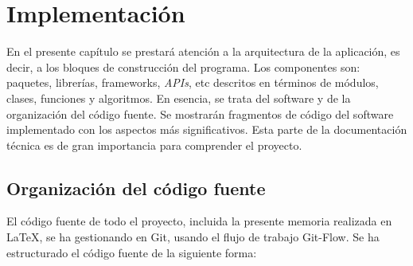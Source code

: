 \chapter[Implementación]{
  \label{chp:implementacion}
  Implementación
}
\minitoc
\newpage

En el presente capítulo se prestará atención a la arquitectura de la aplicación,
es decir, a los bloques de construcción del programa. Los componentes son:
paquetes, librerías, frameworks, \textit{APIs}, etc descritos en términos de
módulos, clases, funciones y algoritmos. En esencia, se trata del software y de
la organización del código fuente. Se mostrarán fragmentos de código del
software implementado con los aspectos más significativos. Esta parte de la
documentación técnica es de gran importancia para comprender el proyecto.


\section{Organización del código fuente}

El código fuente de todo el proyecto, incluida la presente memoria realizada en
\LaTeX, se ha gestionando en Git, usando el flujo de trabajo Git-Flow. Se ha
estructurado el código fuente de la siguiente forma:
